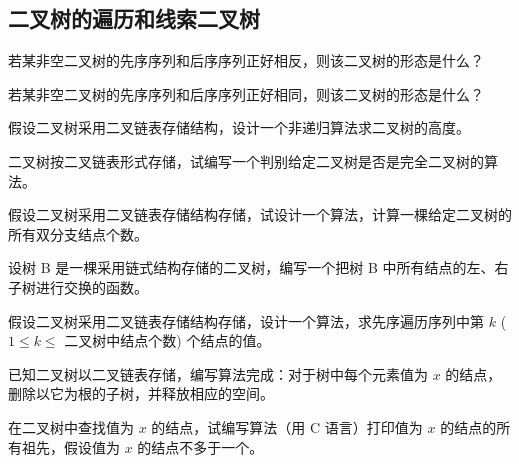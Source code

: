 \subsection{二叉树的遍历和线索二叉树}

\begin{qitems}

    \begin{bbox}
        \qitem 若某非空二叉树的先序序列和后序序列正好相反，则该二叉树的形态是什么？
    \end{bbox}
    
    \begin{bbox}
        \qitem 若某非空二叉树的先序序列和后序序列正好相同，则该二叉树的形态是什么？
    \end{bbox}

    \begin{bbox}
        \qitem 假设二叉树采用二叉链表存储结构，设计一个非递归算法求二叉树的高度。
    \end{bbox}

    \begin{bbox}
        \qitem 二叉树按二叉链表形式存储，试编写一个判别给定二叉树是否是完全二叉树的算法。
    \end{bbox}

    \begin{bbox}
        \qitem 假设二叉树采用二叉链表存储结构存储，试设计一个算法，计算一棵给定二叉树的所有双分支结点个数。
    \end{bbox}
    
    \begin{bbox}
        \qitem 设树 B 是一棵采用链式结构存储的二叉树，编写一个把树 B 中所有结点的左、右子树进行交换的函数。
    \end{bbox}

    \begin{bbox}
        \qitem 假设二叉树采用二叉链表存储结构存储，设计一个算法，求先序遍历序列中第 $k$ ($1 \le k \le$ 二叉树中结点个数) 个结点的值。
    \end{bbox}

    \begin{bbox}
        \qitem 已知二叉树以二叉链表存储，编写算法完成：对于树中每个元素值为 $x$ 的结点，删除以它为根的子树，并释放相应的空间。
    \end{bbox}

    \begin{bbox}
        \qitem 在二叉树中查找值为 $x$ 的结点，试编写算法（用 C 语言）打印值为 $x$ 的结点的所有祖先，假设值为 $x$ 的结点不多于一个。
    \end{bbox}


\end{qitems}
